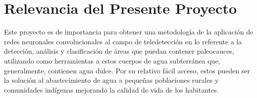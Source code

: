 \section{Relevancia del Presente Proyecto}

Este proyecto es de importancia para obtener una metodología de la aplicación de redes neuronales convolucionales al
campo de teledetección en lo referente a la detección, análisis y clasificación de áreas que puedan contener
paleocauces, utilizando como herramientas a estos cuerpos de agua subterránea que, generalmente, contienen agua dulce.
Por su relativo fácil acceso, estos pueden ser la solución al abastecimiento de agua a pequeñas poblaciones rurales y
comunidades indígenas mejorando la calidad de vida de los habitantes.
